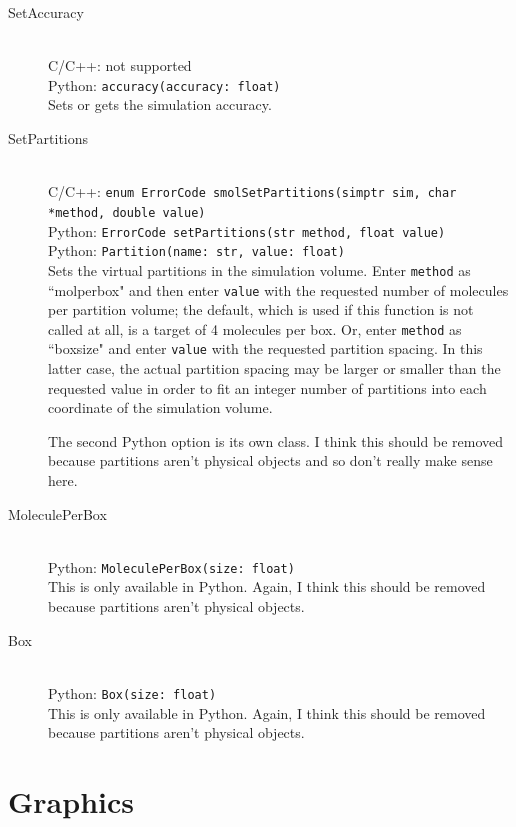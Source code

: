 \documentclass {scrbook}
\newcommand {\ttt} {\texttt}
\begin{document}
\begin{description}
\item[SetAccuracy]
\hfill \\
C/C++: not supported\\
Python: \ttt{accuracy(accuracy: float)}\\
Sets or gets the simulation accuracy.

\item[SetPartitions]
\hfill \\
C/C++: \ttt{enum ErrorCode smolSetPartitions(simptr sim, char *method, double value)}\\
Python: \ttt{ErrorCode setPartitions(str method, float value)}\\
Python: \ttt{Partition(name: str, value: float)}\\
Sets the virtual partitions in the simulation volume. Enter \ttt{method} as ``molperbox" and then enter \ttt{value} with the requested number of molecules per partition volume; the default, which is used if this function is not called at all, is a target of 4 molecules per box. Or, enter \ttt{method} as ``boxsize" and enter \ttt{value} with the requested partition spacing. In this latter case, the actual partition spacing may be larger or smaller than the requested value in order to fit an integer number of partitions into each coordinate of the simulation volume.

The second Python option is its own class. I think this should be removed because partitions aren't physical objects and so don't really make sense here.

\item[MoleculePerBox]
\hfill \\
Python: \ttt{MoleculePerBox(size: float)}\\
This is only available in Python. Again, I think this should be removed because partitions aren't physical objects.

\item[Box]
\hfill \\
Python: \ttt{Box(size: float)}\\
This is only available in Python. Again, I think this should be removed because partitions aren't physical objects.


\end{description}

\section{Graphics}
\end{document}
